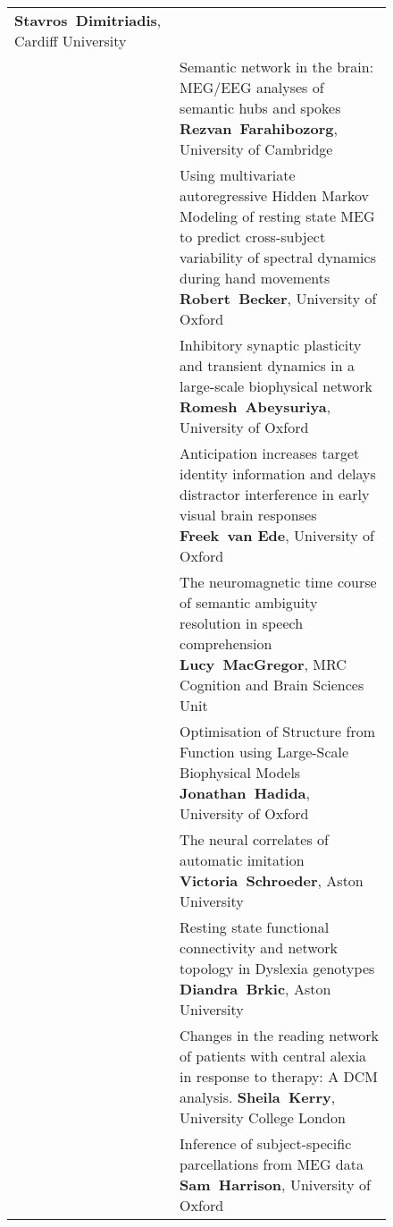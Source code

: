 \begin{figure}[htp]
\begin{tabularx}{\textwidth}{lp{.92\linewidth}}
{} {\bf\footnotesize Stavros~Dimitriadis}, {\footnotesize Cardiff University}  \\
\cellcolor{set1!50}{\bf B-10} & {\footnotesize Semantic network in the brain: MEG/EEG analyses of semantic hubs and spokes
} {\bf\footnotesize Rezvan~Farahibozorg}, {\footnotesize University of Cambridge}  \\
\cellcolor{set1!50}{\bf B-11} & {\footnotesize Using multivariate autoregressive Hidden Markov Modeling of resting state MEG to predict cross-subject variability of spectral dynamics during hand movements
} {\bf\footnotesize Robert~Becker}, {\footnotesize University of Oxford}  \\
\cellcolor{set3!50}{\bf B-12} & {\footnotesize Inhibitory synaptic plasticity and transient dynamics in a large-scale biophysical network
} {\bf\footnotesize Romesh~Abeysuriya}, {\footnotesize University of Oxford}  \\
\cellcolor{set1!50}{\bf B-13} & {\footnotesize Anticipation increases target identity information and delays distractor interference in early visual brain responses
} {\bf\footnotesize Freek~van Ede}, {\footnotesize University of Oxford}  \\
\cellcolor{set1!50}{\bf B-14} & {\footnotesize The neuromagnetic time course of semantic ambiguity resolution in speech comprehension
} {\bf\footnotesize Lucy~MacGregor}, {\footnotesize MRC Cognition and Brain Sciences Unit}  \\
\cellcolor{set3!50}{\bf B-15} & {\footnotesize Optimisation of Structure from Function using Large-Scale Biophysical Models
} {\bf\footnotesize Jonathan~Hadida}, {\footnotesize University of Oxford}  \\
\cellcolor{set1!50}{\bf B-16} & {\footnotesize The neural correlates of automatic imitation
} {\bf\footnotesize Victoria~Schroeder}, {\footnotesize Aston University}  \\
\cellcolor{set2!50}{\bf B-17} & {\footnotesize Resting state functional connectivity and network topology in Dyslexia genotypes
} {\bf\footnotesize Diandra~Brkic}, {\footnotesize Aston University}  \\
\cellcolor{set2!50}{\bf B-18} & {\footnotesize Changes in the reading network of patients with central alexia in response to therapy: A DCM analysis.
} {\bf\footnotesize Sheila~Kerry}, {\footnotesize University College London}  \\
\cellcolor{set3!50}{\bf B-19} & {\footnotesize Inference of subject-specific parcellations from MEG data
} {\bf\footnotesize Sam~Harrison}, {\footnotesize University of Oxford}  \\

\end{tabularx}
\end{figure}
